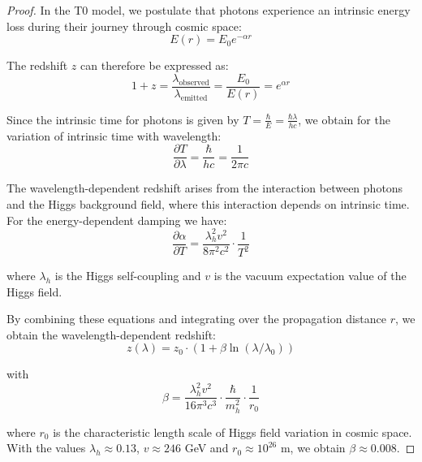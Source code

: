 \documentclass{article}
\theoremstyle{definition}
\theoremstyle{remark}
\begin{document}
	\begin{proof}
		In the T0 model, we postulate that photons experience an intrinsic energy loss during their journey through cosmic space:
		\begin{equation}
			E(r) = E_0 e^{-\alpha r}
		\end{equation}
		
		The redshift $z$ can therefore be expressed as:
		\begin{equation}
			1 + z = \frac{\lambda_{\text{observed}}}{\lambda_{\text{emitted}}} = \frac{E_0}{E(r)} = e^{\alpha r}
		\end{equation}
		
		Since the intrinsic time for photons is given by $T = \frac{\hbar}{E} = \frac{\hbar\lambda}{hc}$, we obtain for the variation of intrinsic time with wavelength:
		\begin{equation}
			\frac{\partial T}{\partial \lambda} = \frac{\hbar}{hc} = \frac{1}{2\pi c}
		\end{equation}
		
		The wavelength-dependent redshift arises from the interaction between photons and the Higgs background field, where this interaction depends on intrinsic time. For the energy-dependent damping we have:
		\begin{equation}
			\frac{\partial \alpha}{\partial T} = \frac{\lambda_h^2 v^2}{8\pi^2 c^2} \cdot \frac{1}{T^2}
		\end{equation}
		
		where $\lambda_h$ is the Higgs self-coupling and $v$ is the vacuum expectation value of the Higgs field.
		
		By combining these equations and integrating over the propagation distance $r$, we obtain the wavelength-dependent redshift:
		\begin{equation}
			z(\lambda) = z_0 \cdot (1 + \beta\ln(\lambda/\lambda_0))
		\end{equation}
		
		with 
		\begin{equation}
			\beta = \frac{\lambda_h^2 v^2}{16\pi^3 c^3} \cdot \frac{\hbar}{m_h^2} \cdot \frac{1}{r_0}
		\end{equation}
		
		where $r_0$ is the characteristic length scale of Higgs field variation in cosmic space. With the values $\lambda_h \approx 0.13$, $v \approx 246$ GeV and $r_0 \approx 10^{26}$ m, we obtain $\beta \approx 0.008$.        
	\end{proof}
	
\end{document}
